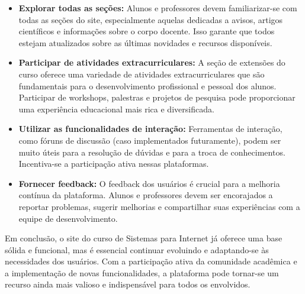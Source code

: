 \documentclass[a4paper,12pt]{report}
\begin{document}
\begin{itemize} 

    \item \textbf{Explorar todas as seções:} Alunos e professores devem familiarizar-se com todas as seções do site, especialmente aquelas dedicadas a avisos, artigos científicos e informações sobre o corpo docente. Isso garante que todos estejam atualizados sobre as últimas novidades e recursos disponíveis. 

    \item \textbf{Participar de atividades extracurriculares:} A seção de extensões do curso oferece uma variedade de atividades extracurriculares que são fundamentais para o desenvolvimento profissional e pessoal dos alunos. Participar de workshops, palestras e projetos de pesquisa pode proporcionar uma experiência educacional mais rica e diversificada. 

    \item \textbf{Utilizar as funcionalidades de interação:} Ferramentas de interação, como fóruns de discussão (caso implementados futuramente), podem ser muito úteis para a resolução de dúvidas e para a troca de conhecimentos. Incentiva-se a participação ativa nessas plataformas. 

    \item \textbf{Fornecer feedback:} O feedback dos usuários é crucial para a melhoria contínua da plataforma. Alunos e professores devem ser encorajados a reportar problemas, sugerir melhorias e compartilhar suas experiências com a equipe de desenvolvimento.

\end{itemize}

Em conclusão, o site do curso de Sistemas para Internet já oferece uma base sólida e funcional, mas é essencial continuar evoluindo e adaptando-se às necessidades dos usuários. Com a participação ativa da comunidade acadêmica e a implementação de novas funcionalidades, a plataforma pode tornar-se um recurso ainda mais valioso e indispensável para todos os envolvidos.
\end{document}
